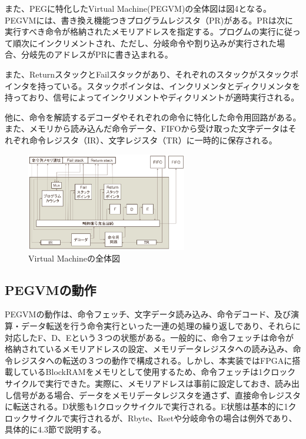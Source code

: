 \documentclass[submit,techrep]{ipsj}
\begin{document}
また、PEGに特化したVirtual Machine(PEGVM)の全体図は図4となる。PEGVMには、書き換え機能つきプログラムレジスタ（PR)がある。PRは次に実行すべき命令が格納されたメモリアドレスを指定する。プログムの実行に従って順次にインクリメントされ、ただし、分岐命令や割り込みが実行された場合、分岐先のアドレスがPRに書き込まれる。

また、ReturnスタックとFailスタックがあり、それぞれのスタックがスタックポインタを持っている。スタックポインタは、インクリメンタとディクリメンタを持っており、信号によってインクリメントやディクリメントが適時実行される。

他に、命令を解読するデコーダやそれぞれの命令に特化した命令用回路がある。また、メモリから読み込んだ命令データ、FIFOから受け取った文字データはそれぞれ命令レジスタ（IR）、文字レジスタ（TR）に一時的に保存される。

\begin{figure}[h]
    \begin{center}
        \includegraphics[width=70mm]{./fig/circuit}
       \caption{Virtual Machineの全体図 }
    \end{center}
\end{figure}

\subsection{PEGVMの動作}

PEGVMの動作は、命令フェッチ、文字データ読み込み、命令デコード、及び演算・データ転送を行う命令実行といった一連の処理の繰り返しであり、それらに対応したF、D、Eという３つの状態がある。一般的に、命令フェッチは命令が格納されているメモリアドレスの設定、メモリデータレジスタへの読み込み、命令レジスタへの転送の３つの動作で構成される。しかし、本実装ではFPGAに搭載しているBlockRAMをメモリとして使用するため、命令フェッチは1クロックサイクルで実行できた。実際に、メモリアドレスは事前に設定しておき、読み出し信号がある場合、データをメモリデータレジスタを通さず、直接命令レジスタに転送される。D状態も1クロックサイクルで実行される。E状態は基本的に1クロックサイクルで実行されるが、Rbyte、Rsetや分岐命令の場合は例外であり、具体的に4.3節で説明する。
\end{document}
